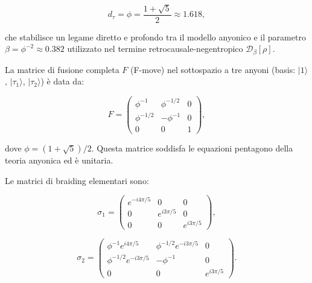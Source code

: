 \documentclass[11pt,a4paper]{article}
\theoremstyle{plain}
\theoremstyle{definition}
\begin{document}
\[
d_\tau = \phi = \frac{1 + \sqrt{5}}{2} \approx 1.618,
\]


\vspace{0.2cm}

che stabilisce un legame diretto e profondo tra il modello anyonico e il parametro $\beta = \phi^{-2} \approx 0.382$ utilizzato nel termine retrocausale-negentropico $\mathcal{D}_\beta[\rho]$.

\vspace{0.3cm}

La matrice di fusione completa $F$ (F-move) nel sottospazio a tre anyoni (basis: $|1\rangle$, $|\tau_1\rangle$, $|\tau_2\rangle$) è data da:


\vspace{0.3cm}

\begin{tcolorbox}[colback=blue!3!white, colframe=blue!80!black, title={Matrice di fusione $F$ completa (3×3) e matrici di braiding per anyoni di Fibonacci}]
\begin{equation}
F = \begin{pmatrix}
\phi^{-1} & \phi^{-1/2} & 0 \\
\phi^{-1/2} & -\phi^{-1} & 0 \\
0 & 0 & 1
\end{pmatrix},
\label{eq:F_matrix_3x3}
\end{equation}

dove $\phi = (1 + \sqrt{5})/2$. Questa matrice soddisfa le equazioni pentagono della teoria anyonica ed è unitaria.



Le matrici di braiding elementari sono:

\begin{equation}
\sigma_1 = \begin{pmatrix}
e^{-i 4\pi/5} & 0 & 0 \\
0 & e^{i 3\pi/5} & 0 \\
0 & 0 & e^{i 3\pi/5}
\end{pmatrix},
\label{eq:sigma1}
\end{equation}

\begin{equation}
\sigma_2 = \begin{pmatrix}
\phi^{-1} e^{i 4\pi/5} & \phi^{-1/2} e^{-i 3\pi/5} & 0 \\
\phi^{-1/2} e^{-i 3\pi/5} & -\phi^{-1} & 0 \\
0 & 0 & e^{i 3\pi/5}
\end{pmatrix}.
\label{eq:sigma2}
\end{equation}
\end{tcolorbox}
\end{document}
